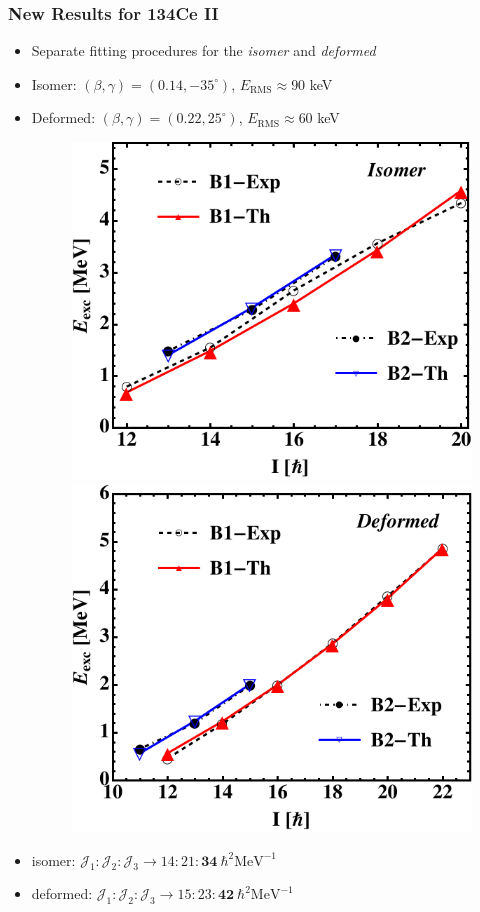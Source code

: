 \documentclass{beamer}
\begin{document}
\begin{frame}
  \frametitle{New Results for 134Ce II}
  \begin{itemize}
    \item Separate fitting procedures for the \emph{isomer} and \emph{deformed}
    \item Isomer: $(\beta,\gamma)=(0.14,-35^\circ)$, $E_\text{RMS}\approx 90$ keV
    \item Deformed: $(\beta,\gamma)=(0.22,25^\circ)$, $E_\text{RMS}\approx 60$ keV
    \begin{figure}
      \centering
      \includegraphics[scale=0.5]{Figs/134Ce-excitation-isomer.pdf}
      \includegraphics[scale=0.5]{Figs/134Ce-excitation-deformed.pdf}
    \end{figure}
    \item isomer: $\mathcal{J}_1:\mathcal{J}_2:\mathcal{J}_3\to 14:21:\mathbf{34}\ \hbar^2\text{MeV}^{-1}$ 
    \item deformed: $\mathcal{J}_1:\mathcal{J}_2:\mathcal{J}_3\to 15:23:\mathbf{42}\ \hbar^2\text{MeV}^{-1}$
  \end{itemize}
\end{frame}
\end{document}
